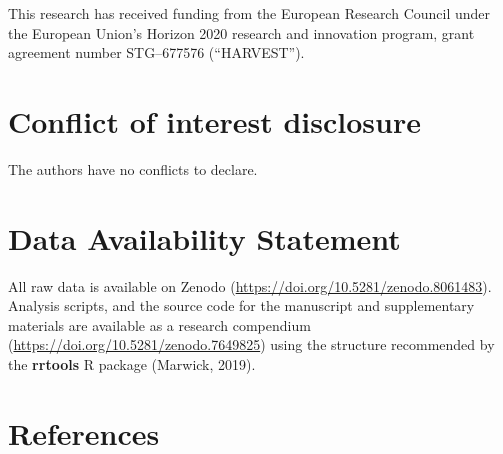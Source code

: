 \documentclass[
]{article}
\begin{document}
This research has received funding from the European Research Council
under the European Union's Horizon 2020 research and innovation program,
grant agreement number STG--677576 (``HARVEST'').

\hypertarget{conflict-of-interest-disclosure}{%
\section*{Conflict of interest
disclosure}\label{conflict-of-interest-disclosure}}

The authors have no conflicts to declare.

\hypertarget{data-availability-statement}{%
\section*{Data Availability
Statement}\label{data-availability-statement}}

All raw data is available on Zenodo
(\url{https://doi.org/10.5281/zenodo.8061483}). Analysis scripts, and
the source code for the manuscript and supplementary materials are
available as a research compendium
(\url{https://doi.org/10.5281/zenodo.7649825}) using the structure
recommended by the \textbf{rrtools} R package (Marwick, 2019).

\hypertarget{references}{%
\section*{References}\label{references}}
\end{document}

